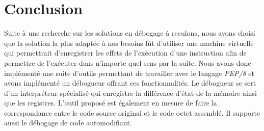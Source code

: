 \documentclass{article}
\begin{document}
\section{Conclusion}\label{conclusion}

Suite à une recherche sur les solutions en débogage à reculons, nous
avons choisi que la solution la plus adaptée à nos besoins fût
d'utiliser une machine virtuelle qui permettrait d'enregistrer les
effets de l'exécution d'une instruction afin de permettre de l'exécuter
dans n'importe quel sens par la suite. Nous avons donc implémenté une
suite d'outils permettant de travailler avec le langage \emph{PEP/8} et
avons implémenté un débogueur offrant ces fonctionnalités. Le débogueur
se sert d'un interpréteur spécialisé qui enregistre la différence d'état
de la mémoire ainsi que les registres. L'outil proposé est également en
mesure de faire la correspondance entre le code source original et le
code octet assemblé. Il supporte aussi le débogage de code
automodifiant.

{}

\end{document}
